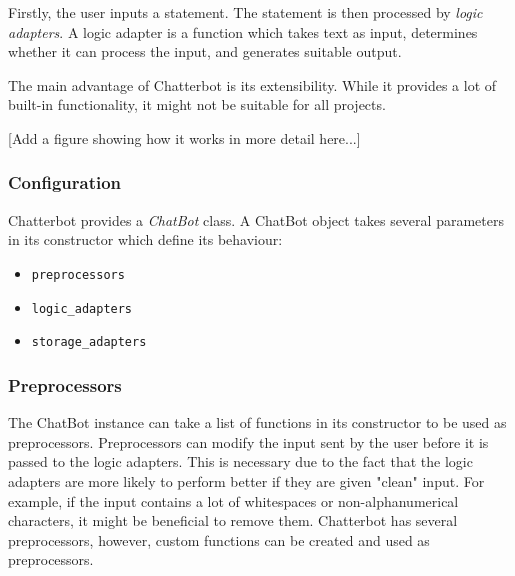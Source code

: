\documentclass[12pt,a4paper]{article}
\begin{document}
Firstly, the user inputs a statement. The statement is then processed by \textit{logic adapters}. A logic adapter is a function which takes text as input, determines whether it can process the input, and generates suitable output.

The main advantage of Chatterbot is its extensibility. While it provides a lot of built-in functionality, it might not be suitable for all projects.

[Add a figure showing how it works in more detail here...]

\subsubsection{Configuration}
Chatterbot provides a \textit{ChatBot} class. A ChatBot object takes several parameters in its constructor which define its behaviour:
\begin{itemize}
    \item \texttt{preprocessors}
    \item \texttt{logic\_adapters}
    \item \texttt{storage\_adapters}
\end{itemize}

\subsubsection{Preprocessors}
The ChatBot instance can take a list of functions in its constructor to be used as preprocessors. Preprocessors can modify the input sent by the user before it is passed to the logic adapters. This is necessary due to the fact that the logic adapters are more likely to perform better if they are given "clean" input. For example, if the input contains a lot of whitespaces or non-alphanumerical characters, it might be beneficial to remove them. Chatterbot has several preprocessors, however, custom functions can be created and used as preprocessors.
\end{document}
